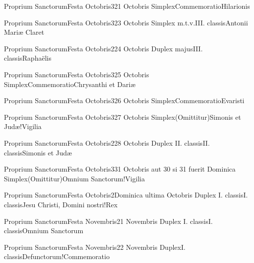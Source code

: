 \documentclass[psalterium-feriale.tex]{subfiles}
\begin{document}
	{Proprium Sanctorum}{Festa Octobris}{3}{21 Octobris}
	{Simplex}{Commemoratio}{Hilarionis}
	{}
	{}
\COPOaRubric

	{Proprium Sanctorum}{Festa Octobris}{3}{23 Octobris}
	{Simplex m.t.v.}{III. classis}{Antonii Mariæ Claret} %
	{}
	{}
\COPOaRubric

	{Proprium Sanctorum}{Festa Octobris}{2}{24 Octobris}
	{Duplex majus}{III. classis}{Raphaëlis}
	{}
	{}
\psalmodiapropria

	{Proprium Sanctorum}{Festa Octobris}{3}{25 Octobris}
	{Simplex}{Commemoratio}{Chrysanthi et Dariæ}
	{}
	{}
\PMEXaRubric

	{Proprium Sanctorum}{Festa Octobris}{3}{26 Octobris}
	{Simplex}{Commemoratio}{Evaristi}
	{}
	{}
\UMEXaRubric

	{Proprium Sanctorum}{Festa Octobris}{3}{27 Octobris}
	{Simplex}{(Omittitur)}{Simonis et Judæ!Vigilia}
	{}
	{}
\feriaRubric

	{Proprium Sanctorum}{Festa Octobris}{2}{28 Octobris}
	{Duplex II. classis}{II. classis}{Simonis et Judæ}
	{}
	{}
\psalmodiapropria

	{Proprium Sanctorum}{Festa Octobris}{3}{31 Octobris aut 30 si 31 fuerit Dominica}
	{Simplex}{(Omittitur)}{Omnium Sanctorum!Vigilia}
	{}
	{}
\feriaRubric

	{Proprium Sanctorum}{Festa Octobris}{2}{Dominica ultima Octobris}
	{Duplex I. classis}{I. classis}{Jesu Christi, Domini nostri!Rex}
	{}
	{}
\psalmodiapropria

	{Proprium Sanctorum}{Festa Novembris}{2}{1 Novembris}
	{Duplex I. classis}{I. classis}{Omnium Sanctorum}
	{}
	{}
\psalmodiapropria


	{Proprium Sanctorum}{Festa Novembris}{2}{2 Novembris}
	{Duplex}{I. classis}{Defunctorum!Commemoratio}
	{}
	{}
\psalmodiapropria
\end{document}

